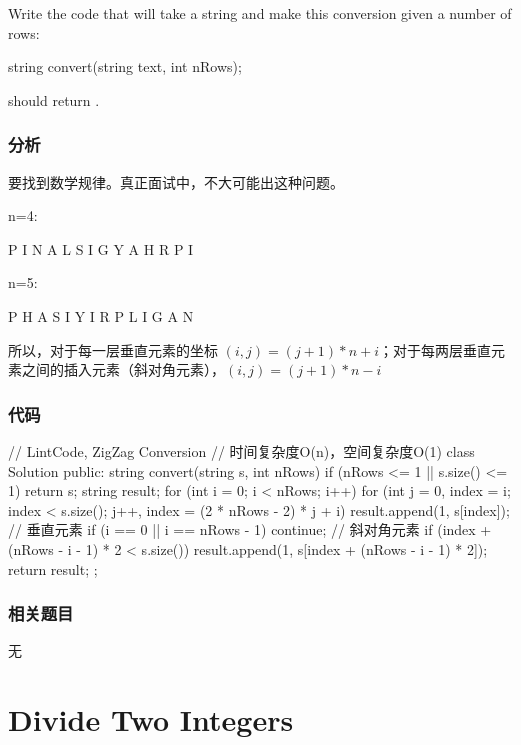 Write the code that will take a string and make this conversion given a number of rows:
\begin{Code}
string convert(string text, int nRows);
\end{Code}
 should return .


\subsubsection{分析}
要找到数学规律。真正面试中，不大可能出这种问题。

n=4:
\begin{Code}
P     I     N
A   L S   I G
Y A   H R
P     I
\end{Code}

n=5:
\begin{Code}
P       H
A     S I
Y   I   R
P L     I  G
A       N
\end{Code}

所以，对于每一层垂直元素的坐标 $(i,j)= (j+1 )*n +i$；对于每两层垂直元素之间的插入元素（斜对角元素），$(i,j)= (j+1)*n -i$


\subsubsection{代码}
\begin{Code}
// LintCode, ZigZag Conversion
// 时间复杂度O(n)，空间复杂度O(1)
class Solution {
public:
    string convert(string s, int nRows) {
        if (nRows <= 1 || s.size() <= 1) return s;
        string result;
        for (int i = 0; i < nRows; i++) {
            for (int j = 0, index = i; index < s.size();
                    j++, index = (2 * nRows - 2) * j + i) {
                result.append(1, s[index]);  // 垂直元素
                if (i == 0 || i == nRows - 1) continue;   // 斜对角元素
                if (index + (nRows - i - 1) * 2 < s.size())
                    result.append(1, s[index + (nRows - i - 1) * 2]);
            }
        }
        return result;
    }
};
\end{Code}


\subsubsection{相关题目}
\begindot
\item 无
\myenddot


\section{Divide Two Integers} %
\label{sec:divide-two-integers}


